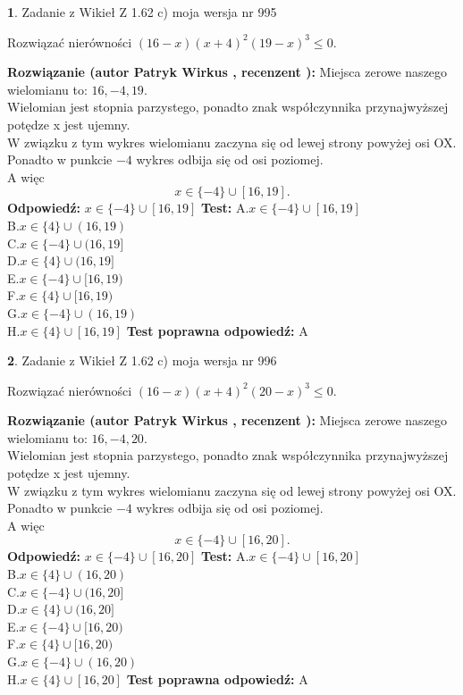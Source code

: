 \documentclass[12pt, a4paper]{article}
\theoremstyle{definition} %
\newtheorem{zad}{}
\newcommand{\zadStart}[1]{\begin{zad}#1\newline}
\newcommand{\zadStop}{\end{zad}}
\newcommand{\rozwStart}[2]{\noindent \textbf{Rozwiązanie (autor #1 , recenzent #2): }\newline}
\newcommand{\rozwStop}{\newline}
\newcommand{\odpStart}{\noindent \textbf{Odpowiedź:}\newline}
\newcommand{\odpStop}{\newline}
\newcommand{\testStart}{\noindent \textbf{Test:}\newline}
\newcommand{\testStop}{\newline}
\newcommand{\kluczStart}{\noindent \textbf{Test poprawna odpowiedź:}\newline}
\newcommand{\kluczStop}{\newline}
\begin{document}
\zadStart{Zadanie z Wikieł Z 1.62 c) moja wersja nr 995}

Rozwiązać nierówności $(16-x)(x+4)^{2}(19-x)^{3}\le0$.
\zadStop
\rozwStart{Patryk Wirkus}{}
Miejsca zerowe naszego wielomianu to: $16, -4, 19$.\\
Wielomian jest stopnia parzystego, ponadto znak współczynnika przy\linebreak najwyższej potędze x jest ujemny.\\ W związku z tym wykres wielomianu zaczyna się od lewej strony powyżej osi OX.\\
Ponadto w punkcie $-4$ wykres odbija się od osi poziomej.\\
A więc $$x \in \{-4\} \cup [16,19].$$
\rozwStop
\odpStart
$x \in \{-4\} \cup [16,19]$
\odpStop
\testStart
A.$x \in \{-4\} \cup [16,19]$\\
B.$x \in \{4\} \cup (16,19)$\\
C.$x \in \{-4\} \cup (16,19]$\\
D.$x \in \{4\} \cup (16,19]$\\
E.$x \in \{-4\} \cup [16,19)$\\
F.$x \in \{4\} \cup [16,19)$\\
G.$x \in \{-4\} \cup (16,19)$\\
H.$x \in \{4\} \cup [16,19]$
\testStop
\kluczStart
A
\kluczStop



\zadStart{Zadanie z Wikieł Z 1.62 c) moja wersja nr 996}

Rozwiązać nierówności $(16-x)(x+4)^{2}(20-x)^{3}\le0$.
\zadStop
\rozwStart{Patryk Wirkus}{}
Miejsca zerowe naszego wielomianu to: $16, -4, 20$.\\
Wielomian jest stopnia parzystego, ponadto znak współczynnika przy\linebreak najwyższej potędze x jest ujemny.\\ W związku z tym wykres wielomianu zaczyna się od lewej strony powyżej osi OX.\\
Ponadto w punkcie $-4$ wykres odbija się od osi poziomej.\\
A więc $$x \in \{-4\} \cup [16,20].$$
\rozwStop
\odpStart
$x \in \{-4\} \cup [16,20]$
\odpStop
\testStart
A.$x \in \{-4\} \cup [16,20]$\\
B.$x \in \{4\} \cup (16,20)$\\
C.$x \in \{-4\} \cup (16,20]$\\
D.$x \in \{4\} \cup (16,20]$\\
E.$x \in \{-4\} \cup [16,20)$\\
F.$x \in \{4\} \cup [16,20)$\\
G.$x \in \{-4\} \cup (16,20)$\\
H.$x \in \{4\} \cup [16,20]$
\testStop
\kluczStart
A
\kluczStop
\end{document}
